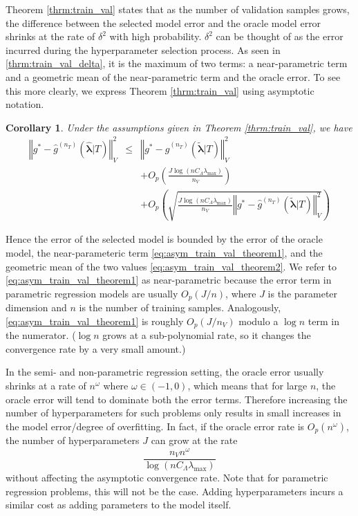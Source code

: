 \documentclass[12pt]{article}
\newtheorem{corollary}{Corollary}
\begin{document}
Theorem \ref{thrm:train_val} states that as the number of validation samples grows, the difference between the selected model error and the oracle model error shrinks at the rate of $\delta^2$ with high probability. $\delta^2$ can be thought of as the error incurred during the hyperparameter selection process. As seen in \eqref{thrm:train_val_delta}, it is the maximum of two terms: a near-parametric term and a geometric mean of the near-parametric term and the oracle error. To see this more clearly, we express Theorem \ref{thrm:train_val} using asymptotic notation.
\begin{corollary}
	Under the assumptions given in Theorem \ref{thrm:train_val}, we have
	\begin{eqnarray}
	\left\Vert g^* - \hat{g}^{(n_T)}( \hat{\boldsymbol{\lambda}} | T) \right\Vert _{V}^2 &\le& \left\Vert g^* - \hat{g}^{(n_T)}( \tilde{\boldsymbol{\lambda}} | T) \right \Vert^2_{V}\\
	&& + O_p \left(\frac{J\log (n C_\Lambda\lambda_{\max})}{n_{V}} \right) 
	\label{eq:asym_train_val_theorem1} \\
	&& + O_p \left(
	\sqrt{
		\frac{J \log (n C_\Lambda\lambda_{\max})}{n_{V}}
		\left\Vert g^* - \hat{g}^{(n_T)}( \tilde{\boldsymbol{\lambda}}| T) \right \Vert^2_{V}
	}
	\right )
	\label{eq:asym_train_val_theorem2}
	\end{eqnarray}
\end{corollary}
Hence the error of the selected model is bounded by the error of the oracle model, the near-parameteric term \eqref{eq:asym_train_val_theorem1}, and the geometric mean of the two values \eqref{eq:asym_train_val_theorem2}. We refer to \eqref{eq:asym_train_val_theorem1} as near-parametric because the error term in parametric regression models are usually $O_p(J/n)$, where $J$ is the parameter dimension and $n$ is the number of training samples. Analogously, \eqref{eq:asym_train_val_theorem1} is roughly $O_p(J/n_V)$ modulo a $\log n$ term in the numerator. ($\log n$ grows at a sub-polynomial rate, so it changes the convergence rate by a very small amount.)

In the semi- and non-parametric regression setting, the oracle error usually shrinks at a rate of $n^\omega$ where $\omega \in (-1, 0)$, which means that for large $n$, the oracle error will tend to dominate both the error terms. Therefore increasing the number of hyperparameters for such problems only results in small increases in the model error/degree of overfitting. In fact, if the oracle error rate is $O_p(n^\omega)$, the number of hyperparameters $J$ can grow at the rate
\begin{equation}
\frac{n_{V} n^\omega }{\log (n C_\Lambda\lambda_{\max})}
\end{equation}
without affecting the asymptotic convergence rate. Note that for parametric regression problems, this will not be the case. Adding hyperparameters incurs a similar cost as adding parameters to the model itself.
\end{document}

